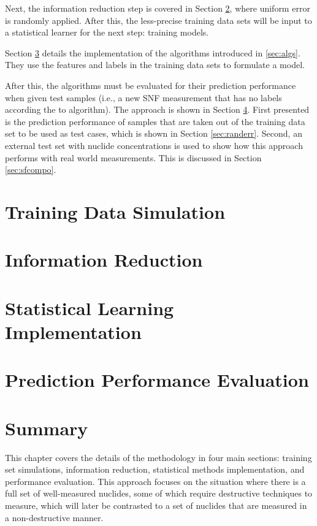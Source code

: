 Next, the information reduction step is covered in Section
\ref{sec:inforeduc1}, where uniform error is randomly applied. After this, the
less-precise training data sets will be input to a statistical learner for the
next step: training models.

Section \ref{sec:statmodel1} details the implementation of the algorithms
introduced in \ref{sec:algs}. They use the features and labels in the training
data sets to formulate a model. 

After this, the algorithms must be evaluated for their prediction performance
when given test samples (i.e., a new \gls{SNF} measurement that has no labels
according the to algorithm).  The approach is shown in Section \ref{sec:eval1}.
First presented is the prediction performance of samples that are taken out of
the training data set to be used as test cases, which is shown in Section
\ref{sec:randerr}.  Second, an external test set with nuclide concentrations is
used to show how this approach performs with real world measurements. This is
discussed in Section \ref{sec:sfcompo}.  

\section{Training Data Simulation}
\label{sec:training1}


\section{Information Reduction}
\label{sec:inforeduc1}


\section{Statistical Learning Implementation}
\label{sec:statmodel1}


\section{Prediction Performance Evaluation}
\label{sec:eval1}


\section{Summary}

This chapter covers the details of the methodology in four main sections:
training set simulations, information reduction, statistical methods
implementation, and performance evaluation. This approach focuses on the
situation where there is a full set of well-measured nuclides, some of which
require destructive techniques to measure, which will later be contrasted to a
set of nuclides that are measured in a non-destructive manner. 

